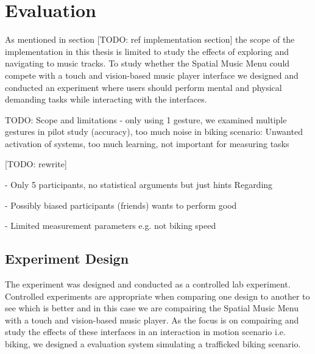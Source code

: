 \chapter{Evaluation}
\label{sec:evaluation}
As mentioned in section [TODO: ref implementation section] the scope of the implementation in this thesis is limited to study the effects of exploring and navigating to music tracks. To study whether the Spatial Music Menu could compete with a touch and vision-based music player interface we designed and conducted an experiment where users should perform mental and physical demanding tasks while interacting with the interfaces.

TODO: Scope and limitations
- only using 1 gesture, we examined multiple gestures in pilot study (accuracy), too much noise in biking scenario: Unwanted activation of systems, too much learning, not important for measuring tasks

[TODO: rewrite]

- Only 5 participants, no statistical arguments but just hints
Regarding

- Possibly biased participants (friends) wants to perform good

- Limited measurement parameters e.g. not biking speed


\section{Experiment Design}
The experiment was designed and conducted as a controlled lab experiment. Controlled experiments are appropriate when comparing one design to another to see which is better \cite{benyon_designing_2010} and in this case we are compairing the Spatial Music Menu with a touch and vision-based music player. As the focus is on compairing and study the effects of these interfaces in an interaction in motion scenario i.e. biking, we designed a evaluation system simulating a trafficked biking scenario.

